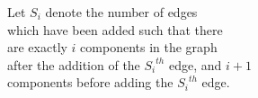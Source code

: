 \documentclass[preview]{standalone}
\begin{document}
\begin{center}
Let $S_{i}$ denote the number of edges \\ which have been added such that there\\ are exactly $i$ components in the graph\\ after the addition of the ${S_i}^{th}$ edge, and $i+1$\\ components before adding the ${S_i}^{th}$ edge.
\end{center}
\end{document}

